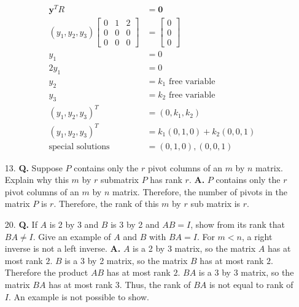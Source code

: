 \documentclass[main.tex]{subfiles}
\begin{document}
\begin{enumerate}
    $$
    \begin{aligned}
    \bm{y}^{T} R &= \bm{0}\\
    \left(y_{1}, y_{2}, y_{3}\right)\left[\begin{array}{lll}
    0 & 1 & 2 \\
    0 & 0 & 0 \\
    0 & 0 & 0
    \end{array}\right] &= \left[\begin{array}{l}
    0 \\
    0 \\
    0
    \end{array}\right]\\
    y_{1} &= 0 \\
    2 y_{1} &= 0 \\
    y_{2} &= k_{1} \text{ free variable}\\
    y_{3} &= k_{2} \text{ free variable}\\
    \left(y_{1}, y_{2}, y_{3}\right)^{T} &= \left(0, k_{1}, k_{2}\right) \\
    \left(y_{1}, y_{2}, y_{3}\right)^{T} &= k_{1}(0,1,0)+k_{2}(0,0,1)\\
    \text{special solutions } & = (0,1,0),(0,0,1)
    \end{aligned}
    $$
    
    \item [13.] \textbf{Q.} Suppose $P$ contains only the $r$ pivot columns of an $m$ by $n$ matrix. Explain why this $m$ by $r$ submatrix $P$ has rank $r$. \textbf{A.} $P$ contains only the $r$ pivot columns of an $m$ by $n$ matrix. Therefore, the number of pivots in the matrix $P$ is $r$. Therefore, the rank of this $m$ by $r$ sub matrix is $r$.
    
    \item [20.] \textbf{Q.} If $A$ is 2 by 3 and $B$ is 3 by 2 and $A B=I$, show from its rank that $B A \neq I$. Give an example of $A$ and $B$ with $B A=I$. For $m<n$, a right inverse is not a left inverse. \textbf{A.} $A$ is a 2 by 3 matrix, so the matrix $A$ has at most rank $2$. $B$ is a 3 by 2 matrix, so the matrix $B$ has at most rank $2$. Therefore the product $A B$ has at most rank $2$. $B A$ is a 3 by 3 matrix, so the matrix $B A$ has at most rank 3. Thus, the rank of $B A$ is not equal to rank of $I$. An example is not possible to show.
    
\end{enumerate}
\end{document}
